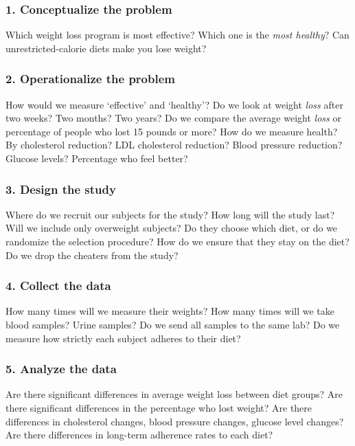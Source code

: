 \documentclass[11pt, chapterprefix=true]{scrbook}\usepackage[]{graphicx}\usepackage[]{color}
\begin{document}
\subsubsection{1.	Conceptualize the problem}

Which weight loss program is most effective?   Which one is the \textit{most healthy}?   Can \\ unrestricted-calorie diets make you lose weight?

\subsubsection{2.	Operationalize the problem}

How would we measure `effective' and `healthy'?  Do we look at weight \textit{loss} after two weeks? Two months?  Two years?  Do we compare the average weight \textit{loss} or percentage of people who lost 15 pounds or more?  How do we measure health?  By cholesterol reduction?  LDL cholesterol reduction?  Blood pressure reduction?  Glucose levels?  Percentage who feel better?

\subsubsection{3.	Design the study}

Where do we recruit our subjects for the study? How long will the study last?  Will we include only overweight subjects?  Do they choose which diet, or do we randomize the selection procedure?  How do we ensure that they stay on the diet?  Do we drop the cheaters from the study?

\subsubsection{4.	Collect the data}

How many times will we measure their weights?  How many times will we take blood samples?  Urine samples?  Do we send all samples to the same lab?  Do we measure how strictly each subject adheres to their diet?

\subsubsection{5.	Analyze the data}

Are there significant differences in average weight loss between diet groups?  Are there significant differences in the percentage who lost weight?  Are there differences in cholesterol changes, blood pressure changes, glucose level changes?  Are there differences in long-term adherence rates to each diet?
\end{document}
